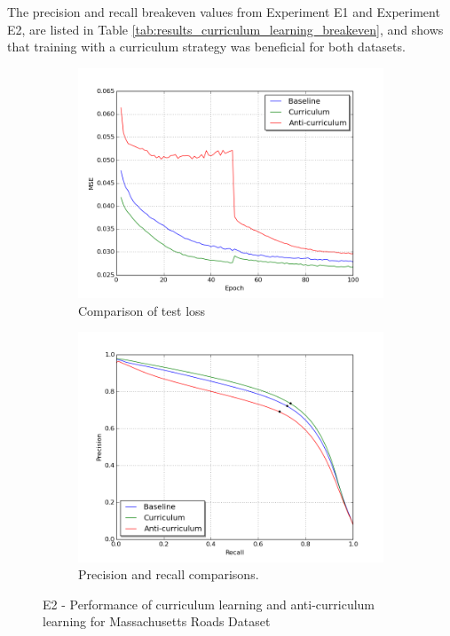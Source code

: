 The precision and recall breakeven values from Experiment E1 and Experiment E2, are listed in Table \ref{tab:results_curriculum_learning_breakeven}, and shows that training with a curriculum strategy was beneficial for both datasets.\\
\begin{figure}[!ht]
\begin{subfigure}{0.48\textwidth}
\includegraphics[width=\linewidth]{figs/E2/E2-lc.png}
\caption{Comparison of test loss} \label{fig:E2_curr_mass_loss}
\end{subfigure}
\hspace*{\fill} %
\begin{subfigure}{0.48\textwidth}
\includegraphics[width=\linewidth]{figs/E2/E2-pr.png}
\caption{Precision and recall comparisons.} \label{fig:E2_curr_mass_pr}
\end{subfigure}
\hspace*{\fill} %
\caption{E2 - Performance of curriculum learning and anti-curriculum learning for Massachusetts Roads Dataset} \label{fig:E2_curriculum_mass}
\end{figure}

